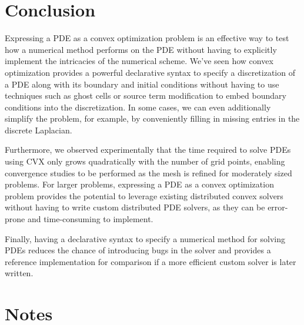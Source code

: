 \documentclass[conference]{IEEEtran}
\begin{document}
\section{Conclusion}

Expressing a PDE as a convex optimization problem is an effective way to test how a numerical method performs on the PDE without having to explicitly implement the intricacies of the numerical scheme. We've seen how convex optimization provides a powerful declarative syntax to specify a discretization of a PDE along with its boundary and initial conditions without having to use techniques such as ghost cells or source term modification to embed boundary conditions into the discretization. In some cases, we can even additionally simplify the problem, for example, by conveniently filling in missing entries in the discrete Laplacian.

Furthermore, we observed experimentally that the time required to solve PDEs using CVX only grows quadratically with the number of grid points, enabling convergence studies to be performed as the mesh is refined for moderately sized problems. For larger problems, expressing a PDE as a convex optimization problem provides the potential to leverage existing distributed convex solvers without having to write custom distributed PDE solvers, as they can be error-prone and time-consuming to implement.

Finally, having a declarative syntax to specify a numerical method for solving PDEs reduces the chance of introducing bugs in the solver and provides a reference implementation for comparison if a more efficient custom solver is later written.


\section*{Notes}

 \cite{dummy}





\end{document}
